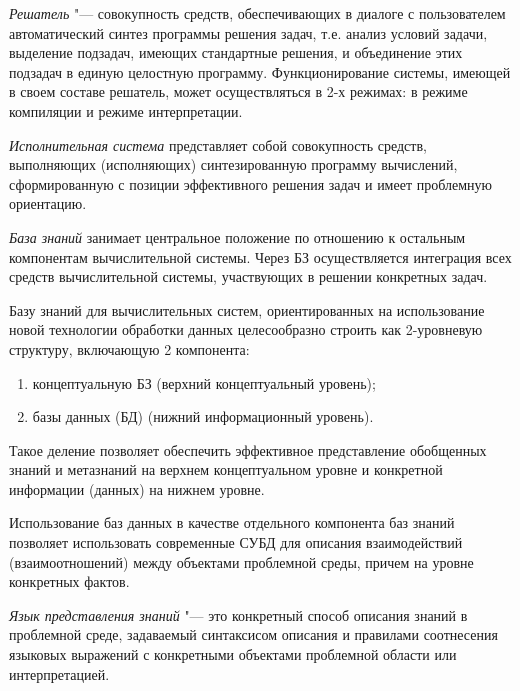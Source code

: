 \emph{Решатель} "--- совокупность средств, обеспечивающих в диалоге с
пользователем автоматический синтез программы решения задач,
т.е. анализ условий задачи, выделение подзадач, имеющих стандартные
решения, и объединение этих подзадач в единую целостную
программу. Функционирование системы, имеющей в своем составе решатель,
может осуществляться в 2-х режимах: в режиме компиляции и режиме
интерпретации.

\emph{Исполнительная система} представляет собой совокупность средств,
выполняющих (исполняющих) синтезированную программу вычислений,
сформированную с позиции эффективного решения задач и имеет проблемную
ориентацию.

\emph{База знаний} занимает центральное положение по отношению к остальным
компонентам вычислительной системы. Через БЗ осуществляется интеграция
всех средств вычислительной системы, участвующих в решении конкретных
задач.

Базу знаний для вычислительных систем, ориентированных на
использование новой технологии обработки данных целесообразно строить
как 2-уровневую структуру, включающую 2 компонента:
\begin{enumerate}
\item концептуальную БЗ (верхний концептуальный уровень);
\item базы данных (БД) (нижний информационный уровень).
\end{enumerate}
Такое деление позволяет обеспечить эффективное представление
обобщенных знаний и метазнаний на верхнем концептуальном уровне и
конкретной информации (данных) на нижнем уровне.

Использование баз данных в качестве отдельного компонента баз знаний
позволяет использовать современные СУБД для описания взаимодействий
(взаимоотношений) между объектами проблемной среды, причем на уровне
конкретных фактов.

\emph{Язык представления знаний} "--- это конкретный способ описания знаний в
проблемной среде, задаваемый синтаксисом описания и правилами
соотнесения языковых выражений с конкретными объектами проблемной
области или интерпретацией.



